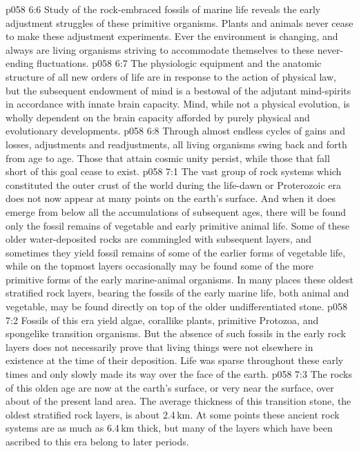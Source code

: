 \vs p058 6:6 Study of the rock\hyp{}embraced fossils of marine life reveals the early adjustment struggles of these primitive organisms. Plants and animals never cease to make these adjustment experiments. Ever the environment is changing, and always are living organisms striving to accommodate themselves to these never\hyp{}ending fluctuations.
\vs p058 6:7 The physiologic equipment and the anatomic structure of all new orders of life are in response to the action of physical law, but the subsequent endowment of mind is a bestowal of the adjutant mind\hyp{}spirits in accordance with innate brain capacity. Mind, while not a physical evolution, is wholly dependent on the brain capacity afforded by purely physical and evolutionary developments.
\vs p058 6:8 Through almost endless cycles of gains and losses, adjustments and readjustments, all living organisms swing back and forth from age to age. Those that attain cosmic unity persist, while those that fall short of this goal cease to exist.
\vs p058 7:1 The vast group of rock systems which constituted the outer crust of the world during the life\hyp{}dawn or Proterozoic era does not now appear at many points on the earth’s surface. And when it does emerge from below all the accumulations of subsequent ages, there will be found only the fossil remains of vegetable and early primitive animal life. Some of these older water\hyp{}deposited rocks are commingled with subsequent layers, and sometimes they yield fossil remains of some of the earlier forms of vegetable life, while on the topmost layers occasionally may be found some of the more primitive forms of the early marine\hyp{}animal organisms. In many places these oldest stratified rock layers, bearing the fossils of the early marine life, both animal and vegetable, may be found directly on top of the older undifferentiated stone.
\vs p058 7:2 Fossils of this era yield algae, corallike plants, primitive Protozoa, and spongelike transition organisms. But the absence of such fossils in the early rock layers does not necessarily prove that living things were not elsewhere in existence at the time of their deposition. Life was sparse throughout these early times and only slowly made its way over the face of the earth.
\vs p058 7:3 \pc The rocks of this olden age are now at the earth’s surface, or very near the surface, over about  of the present land area. The average thickness of this transition stone, the oldest stratified rock layers, is about 2.4\,km. At some points these ancient rock systems are as much as 6.4\,km thick, but many of the layers which have been ascribed to this era belong to later periods.
